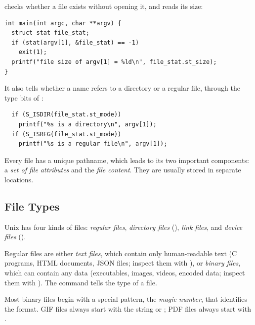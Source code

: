 \begin{example}
   checks whether a file exists without opening it, and reads its size:
\begin{lstlisting}
int main(int argc, char **argv) {
  struct stat file_stat;
  if (stat(argv[1], &file_stat) == -1)
    exit(1);
  printf("file size of argv[1] = %ld\n", file_stat.st_size);
}
\end{lstlisting}
  It also tells whether a name refers to a directory or a regular file, through the type bits of :
\begin{lstlisting}
  if (S_ISDIR(file_stat.st_mode))
    printf("%s is a directory\n", argv[1]);
  if (S_ISREG(file_stat.st_mode))
    printf("%s is a regular file\n", argv[1]);
\end{lstlisting}
\end{example}

\begin{keypoint}
  Every file has a unique pathname, which leads to its two important components: a \emph{set of file attributes} and the \emph{file content}. They are usually stored in separate locations.
\end{keypoint}

\subsection{File Types}

Unix has four kinds of files: \emph{regular files}, \emph{directory files} (), \emph{link files}, and \emph{device files} ().

Regular files are either \emph{text files}, which contain only human-readable text (C programs, HTML documents, JSON files; inspect them with ), or \emph{binary files}, which can contain any data (executables, images, videos, encoded data; inspect them with ). The command  tells the type of a file.

\begin{definition}
  Most binary files begin with a special pattern, the \emph{magic number}, that identifies the format. GIF files always start with the string  or ; PDF files always start with .
\end{definition}

